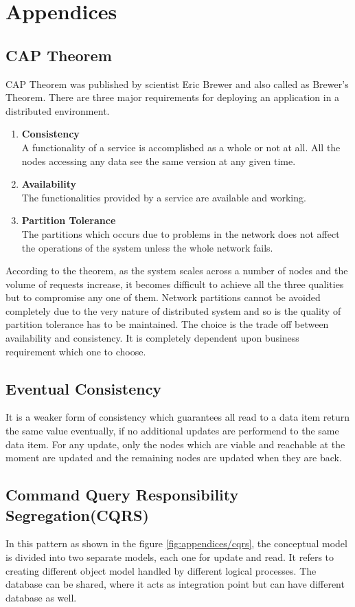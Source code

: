 \chapter{Appendices}\label{chapter:appendices}

\section{CAP Theorem}\label{section:appendices/CAP_theorem}
CAP Theorem was published by scientist Eric Brewer and also called as Brewer's Theorem. There are three major requirements for deploying an application in a distributed environment.
\begin{enumerate}
\item \textbf{Consistency}\\
A functionality of a service is accomplished as a whole or not at all. All the nodes accessing any data see the same version at any given time.
\item \textbf{Availability}\\
The functionalities provided by a service are available and working.
\item \textbf{Partition Tolerance}\\
The partitions which occurs due to problems in the network does not affect the operations of the system unless the whole network fails.
\end{enumerate}
According to the theorem, as the system scales across a number of nodes and the volume of requests increase, it becomes difficult to achieve all the three qualities but to compromise any one of them. \cite{Julian:2009aa}
Network partitions cannot be avoided completely due to the very nature of distributed system and so is the quality of partition tolerance has to be maintained. The choice is the trade off between availability and consistency. It is completely dependent upon business requirement which one to choose. \cite{Peter-Bailis:2013aa}
\section{Eventual Consistency}\label{section:appendices/eventual_consistency}
It is a weaker form of consistency which guarantees all read to a data item return the same value eventually, if no additional updates are performend to the same data item. For any update, only the nodes which are viable and reachable at the moment are updated and the remaining nodes are updated when they are back. \cite{Peter-Bailis:2013aa}
\section{Command Query Responsibility Segregation(CQRS)}\label{section:appendices/CQRS}
In this pattern as shown in the figure \ref{fig:appendices/cqrs}, the conceptual model is divided into two separate models, each one for update and read. It refers to creating different object model handled by different logical processes. The database can be shared, where it acts as integration point but can have different database as well.

